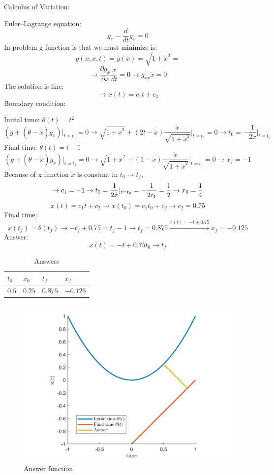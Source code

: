 Calculus of Variation:


Euler–Lagrange equation:
$$g_x - \dfrac{d}{dt}g_{\dot{x}} = 0$$
In problem g function is that we must minimize is:
$$g(\dot{x}, x, t) = g(\dot{x}) = \sqrt{1+\dot{x}^2} = $$
$$\to \dfrac{\partial g_{\dot{x}}}{\partial \dot{x}} \dfrac{\dot{x}}{dt} = 0 \to g_{\dot{x}\dot{x}}\ddot{x} = 0 $$
The solution is line:
$$\to x(t) = c_1t+ c_2$$
Boundary condition:



Initial time: 
$\theta(t) = t^2 $
$$(g + (\dot{\theta}-\dot{x})g_{\dot{x}}) \vert_{t = t_0}= 0 \to \sqrt{1+\dot{x}^2} + (2t -\dot{x} )\dfrac{\dot{x}}{\sqrt{1+\dot{x}^2}}\vert_{t = t_0} = 0 \to t_0 = -\dfrac{1}{2\dot{x}}\vert_{t = t_0}$$
Final time: 
$\theta(t) = t-1 $
$$(g + (\dot{\theta}-\dot{x})g_{\dot{x}})\vert_{t = t_f}  = 0 \to \sqrt{1+\dot{x}^2} + (1-\dot{x}) \dfrac{\dot{x}}{\sqrt{1+\dot{x}^2}}\vert_{t = t_f} = 0 \to \dot{x}_f = -1$$
Because of x function $\dot{x}$ is constant in $t_0 \to t_f$,
$$\to c_1 = -1\\
\to t_0 = \dfrac{1}{2\dot{x}}\vert_{t = t_0} =-\dfrac{1}{2c_1} = \dfrac12 \to x_0 = \frac14 $$ 
$$x(t) = c_1t+c_2 \to x(t_0) = c_1t_0 + c_2 \to c_2 = 0.75$$
Final time:
$$x(t_f) = \theta(t_f) \to -t_f + 0.75 = t_f-1 \to t_f = 0.875 \xrightarrow{x(t) = -t+0.75} x_f = -0.125$$
Answer:
$$x(t) = -t+0.75 t_0 \to t_f$$

\begin{table}[H]
	\caption {Answers} \label{ans} 
	\begin{center}
		\begin{tabular}{| l | l | l | l |}
			\hline
			$t_0$ & $x_0$ & $t_f$ & $x_f$ \TBstrut \\
			\hline
			$0.5$ & $0.25$ & $0.875$ & $-0.125$ \Tstrut\\
			\hline
		\end{tabular}
	\end{center}
\end{table}
\begin{figure}[H]
	\caption{Answer function}
	\centering
	\includegraphics[width=12cm]{Q3/figures/Q3figureFix.png}
\end{figure}
